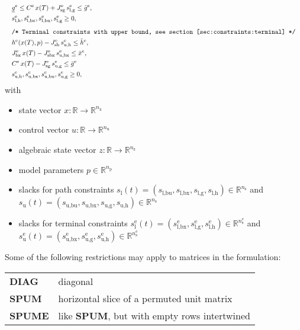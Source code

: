 \documentclass[
a4paper, %
10pt, %
notitlepage,
english]{CSUniSchoolLabReport}
\newcommand{\ind}[1]{_{\textrm{#1}}}
\newcommand{\terminal}{^{\textrm{e}}}
\newcommand{\Lower}{\ind{l}}
\newcommand{\lowerh}{\ind{l,h}}
\newcommand{\lowerbx}{\ind{l,bx}}
\newcommand{\lowerbu}{\ind{l,bu}}
\newcommand{\lowerg}{\ind{l,g}}
\newcommand{\upper}{\ind{u}}
\newcommand{\upperh}{\ind{u,h}}
\newcommand{\upperbx}{\ind{u,bx}}
\newcommand{\upperbu}{\ind{u,bu}}
\newcommand{\upperg}{\ind{u,g}}
\newcommand{\mathComment}[1]{\texttt{/* #1 */}}
\newcommand{\R}{\mathbb{R}}
\newcommand{\nx}{n\ind{x}}
\newcommand{\nuu}{n\ind{u}}
\newcommand{\nz}{n\ind{z}}
\newcommand{\np}{n\ind{p}}
\newcommand{\ns}{n\ind{s}}
\begin{document}
\begin{appendices}
\begin{align}
	&&&\underline{g}\terminal \leq C\terminal\, x(T) + J\ind{sg}\terminal\, s\lowerg\terminal \leq \bar{g}\terminal, && \\
	&&& s\lowerh\terminal, s\lowerbx\terminal, s\lowerbu\terminal, s\lowerg\terminal \geq 0, \label{eq:constraints:terminal:lower_bounds:end}\\[1ex]
	&&&\mathComment{Terminal constraints with upper bound, see section \ref{sec:constraints:terminal}}\nonumber\\
	&&& h\terminal(x(T), p) - J\ind{sh}\terminal\, s\ind{u,h}\terminal \leq \bar{h}\terminal, &&\label{eq:constraints:terminal:upper_bounds:start}\\
	&&& J_{\textrm{bx}}\terminal\, x(T) - J\ind{sbx}\terminal\, s\ind{u,bx}\terminal \leq \bar{x}^{e}, &&\\ %
	&&& C\terminal\, x(T) - J\ind{sg}\terminal\, s\ind{u,g}\terminal \leq \bar{g}\terminal \\
	&&& s\upperh\terminal, s\upperbx\terminal, s\upperbu\terminal, s\upperg\terminal \geq 0,\label{eq:constraints:terminal:upper_bounds:end}
\end{align}
%
with
\begin{itemize}
	\item state vector $ x: \R \rightarrow \R^{\nx} $
	\item control vector $ u: \R \rightarrow \R^{\nuu} $
	\item algebraic state vector $ z: \R \rightarrow \R^{\nz} $
	\item model parameters $ p \in \R^{\np} $
	\item slacks for path constraints $ s\Lower(t) = (s\lowerbu, s\lowerbx, s\lowerg, s\lowerh) \in \R^{\ns} $ and $ s\upper(t) = (s\upperbu, s\upperbx, s\upperg, s\upperh) \in \R^{\ns} $
	\item slacks for terminal constraints $ s\Lower\terminal(t) = (s\lowerbx\terminal, s\lowerg\terminal, s\lowerh\terminal) \in \R^{\ns\terminal} $ and $ s\upper\terminal(t) = (s\upperbx\terminal, s\upperg\terminal, s\upperh\terminal) \in \R^{\ns\terminal} $
\end{itemize}
%
Some of the following restrictions may apply to matrices in the formulation:
\begin{center}
	\begin{tabular}{ll}
		\textbf{DIAG} & diagonal\\
		\textbf{SPUM} & horizontal slice of a permuted unit matrix\\
		\textbf{SPUME} & like \textbf{SPUM}, but with empty rows intertwined
	\end{tabular}
\end{center}
%

\end{appendices}
\end{document}
